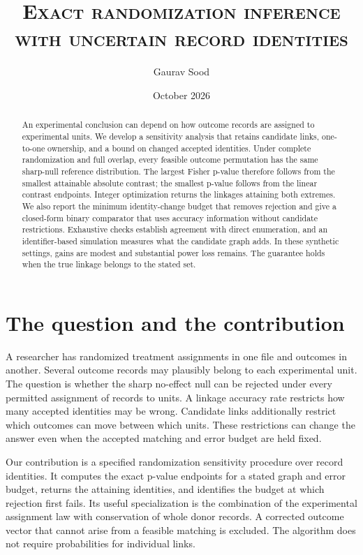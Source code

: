 \documentclass[11pt]{article}
\title{\scshape Exact randomization inference with uncertain record identities}
\author{Gaurav Sood}
\date{October 2026}
\begin{document}
\maketitle
\begin{abstract}
An experimental conclusion can depend on how outcome records are assigned to experimental
units. We develop a sensitivity analysis that retains candidate links, one-to-one ownership,
and a bound on changed accepted identities. Under complete randomization and full overlap,
every feasible outcome permutation has the same sharp-null reference distribution.
The largest Fisher p-value therefore follows from the smallest attainable absolute
contrast; the smallest p-value follows from the linear contrast endpoints. Integer
optimization returns the linkages attaining both extremes. We also report the minimum
identity-change budget that removes rejection and give a closed-form binary comparator
that uses accuracy information without candidate restrictions. Exhaustive checks establish
agreement with direct enumeration, and an identifier-based simulation measures what the
candidate graph adds. In these synthetic settings, gains are modest and substantial
power loss remains. The guarantee holds when the true linkage belongs to the stated set.
\end{abstract}

\section{The question and the contribution}
A researcher has randomized treatment assignments in one file and outcomes in another.
Several outcome records may plausibly belong to each experimental unit. The question is
whether the sharp no-effect null can be rejected under every permitted assignment of
records to units. A linkage accuracy rate restricts how many accepted identities may be
wrong. Candidate links additionally restrict which outcomes can move between which units.
These restrictions can change the answer even when the accepted matching and error budget
are held fixed.

Our contribution is a specified randomization sensitivity procedure over record identities.
It computes the exact p-value endpoints for a stated graph and error budget, returns the
attaining identities, and identifies the budget at which rejection first fails. Its useful
specialization is the combination of the experimental assignment law with conservation of
whole donor records. A corrected outcome vector that cannot arise from a feasible matching
is excluded. The algorithm does not require probabilities for individual links.
\end{document}
